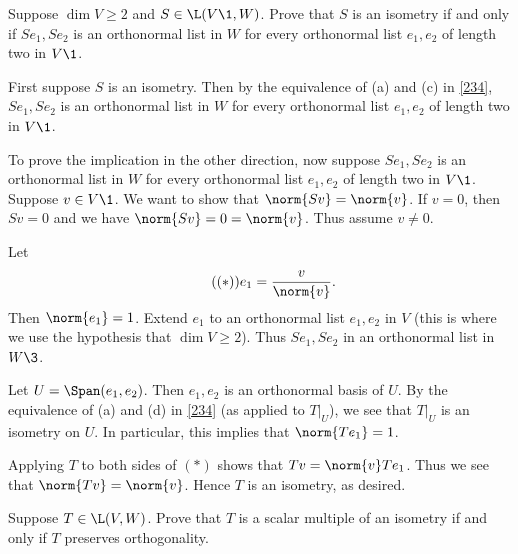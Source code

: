 
\exercise
Suppose $\dim V \ge 2$ and $S\in \L(V\1, W)$. Prove that $S$ is an isometry if and only if $Se_1, Se_2$ is an orthonormal list in $W$ for every orthonormal list $e_1, e_2$ of length two in $V\1$.\label{2iso}

\begin{Solution}
First suppose $S$ is an isometry. Then by the equivalence of (a) and (c) in \ref{234}, $Se_1, Se_2$ is an orthonormal list in $W$ for every orthonormal list $e_1, e_2$ of length two in $V\1$.

To prove the implication in the other direction, now suppose $Se_1, Se_2$ is an orthonormal list in $W$ for every orthonormal list
$e_1, e_2$ of length two in $V\1$. Suppose $v \in V\1$. We want to show that $\norm{Sv} = \norm{v}$. If $v = 0$, then $Sv = 0$ and we have $\norm{Sv} = 0 = \norm{v}$. Thus assume $v \ne 0$.

Let
\[ \tag{$(*)$}
e_1 = \frac{v}{\norm{v}}.
\]
Then $\norm{e_1} = 1$. Extend $e_1$ to an orthonormal list $e_1, e_2$ in $V$ (this is where we use the hypothesis that
$\dim V \ge 2$). Thus $Se_1, Se_2$ in an orthonormal list in $W\3$.

Let $U = \Span(e_1, e_2)$. Then $e_1, e_2$ is an orthonormal basis of $U$. By the equivalence of (a) and (d) in \ref{234} (as applied to $T|_U$), we see that $T|_U$ is an isometry on $U$. In particular, this implies that $\norm{Te_1} = 1$.

Applying $T$ to both sides of $(*)$ shows that $Tv = \norm{v} Te_1$. Thus we see that $\norm{Tv} = \norm{v}$. Hence $T$ is an isometry, as desired.
\end{Solution}

\exercise
Suppose $T \in \L(V, W)$. Prove that $T$ is a scalar multiple of an isometry if and only if $T$ preserves orthogonality.


